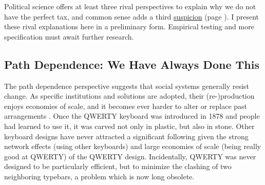 



Political science offers at least three rival perspectives to explain why we do not have the perfect tax, and common sense adds a third \hyperref[sec:Conspiracy]{suspicion} (page \pageref{sec:Conspiracy}). I present these rival explanations here in a preliminary form. Empirical testing and more specification must await further research.

\subsection[Path Dependence]{Path Dependence: We Have Always Done This} The path dependence perspective suggests that social systems generally resist change. As specific institutions and solutions are adopted, their (re-)production enjoys economies of scale, and it becomes ever harder to alter or replace past arrangements \citep{Mahoney-2000-aa,Pierson-2000-aa}. Once the QWERTY keyboard was introduced in 1878 and people had learned to use it, it was carved not only in plastic, but also in stone. Other keyboard designs have never attracted a significant following given the strong network effects (using other keyboards) and large economies of scale (being really good at QWERTY) of the QWERTY design. Incidentally, QWERTY was never designed to be particularly efficient, but to minimize the clashing of two neighboring typebars, a problem which is now long obsolete.

